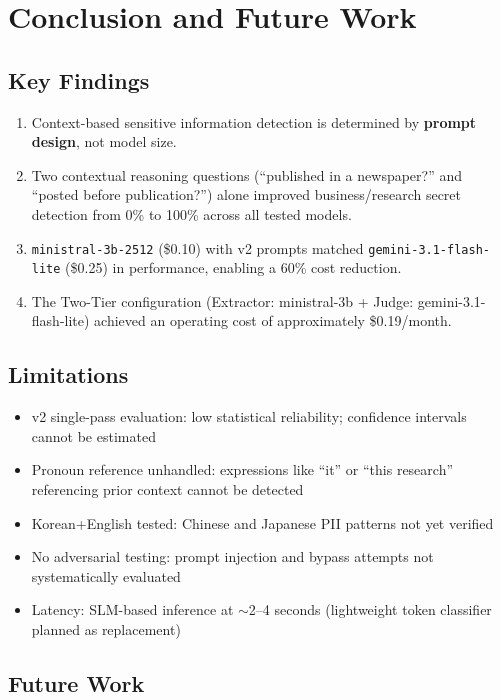 \documentclass[11pt,a4paper]{article}
\begin{document}
\section{Conclusion and Future Work}

\subsection{Key Findings}

\begin{enumerate}[nosep]
  \item Context-based sensitive information detection is determined by \textbf{prompt design}, not model size.
  \item Two contextual reasoning questions (``published in a newspaper?'' and ``posted before publication?'') alone improved business/research secret detection from 0\% to 100\% across all tested models.
  \item \texttt{ministral-3b-2512} (\$0.10) with v2 prompts matched \texttt{gemini-3.1-flash-lite} (\$0.25) in performance, enabling a 60\% cost reduction.
  \item The Two-Tier configuration (Extractor: ministral-3b + Judge: gemini-3.1-flash-lite) achieved an operating cost of approximately \$0.19/month.
\end{enumerate}

\subsection{Limitations}

\begin{itemize}[nosep]
  \item v2 single-pass evaluation: low statistical reliability; confidence intervals cannot be estimated
  \item Pronoun reference unhandled: expressions like ``it'' or ``this research'' referencing prior context cannot be detected
  \item Korean+English tested: Chinese and Japanese PII patterns not yet verified
  \item No adversarial testing: prompt injection and bypass attempts not systematically evaluated
  \item Latency: SLM-based inference at $\sim$2--4 seconds (lightweight token classifier planned as replacement)
\end{itemize}

\subsection{Future Work}
\end{document}
